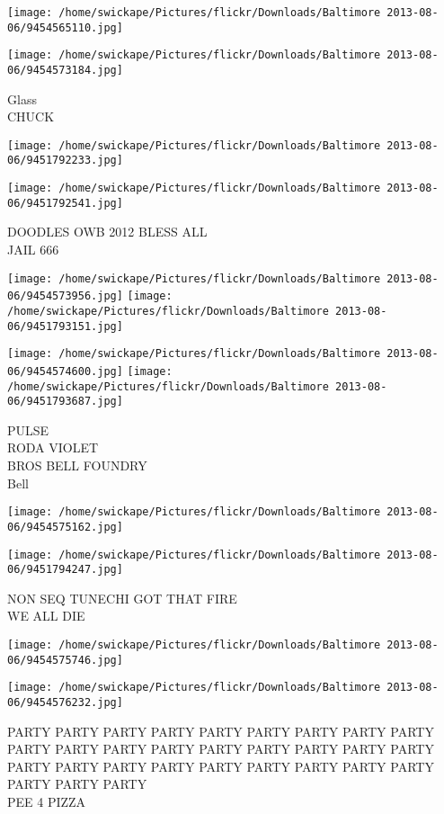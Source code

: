 \documentclass[10pt,letterpaper]{article}
\begin{document}
\texttt{[image: /home/swickape/Pictures/flickr/Downloads/Baltimore 2013-08-06/9454565110.jpg]}

\vspace{0.25in}
\texttt{[image: /home/swickape/Pictures/flickr/Downloads/Baltimore 2013-08-06/9454573184.jpg]}

Glass\\
CHUCK
\pagebreak

\texttt{[image: /home/swickape/Pictures/flickr/Downloads/Baltimore 2013-08-06/9451792233.jpg]}

\vspace{0.25in}
\texttt{[image: /home/swickape/Pictures/flickr/Downloads/Baltimore 2013-08-06/9451792541.jpg]}

DOODLES OWB 2012 BLESS ALL\\
JAIL 666
\pagebreak

\texttt{[image: /home/swickape/Pictures/flickr/Downloads/Baltimore 2013-08-06/9454573956.jpg]}
\texttt{[image: /home/swickape/Pictures/flickr/Downloads/Baltimore 2013-08-06/9451793151.jpg]}

\texttt{[image: /home/swickape/Pictures/flickr/Downloads/Baltimore 2013-08-06/9454574600.jpg]}
\texttt{[image: /home/swickape/Pictures/flickr/Downloads/Baltimore 2013-08-06/9451793687.jpg]}

PULSE\\
RODA VIOLET\\
BROS BELL FOUNDRY\\
Bell
\pagebreak

\texttt{[image: /home/swickape/Pictures/flickr/Downloads/Baltimore 2013-08-06/9454575162.jpg]}

\vspace{0.25in}
\texttt{[image: /home/swickape/Pictures/flickr/Downloads/Baltimore 2013-08-06/9451794247.jpg]}

NON SEQ TUNECHI GOT THAT FIRE\\
WE ALL DIE
\pagebreak

\texttt{[image: /home/swickape/Pictures/flickr/Downloads/Baltimore 2013-08-06/9454575746.jpg]}

\vspace{0.25in}
\texttt{[image: /home/swickape/Pictures/flickr/Downloads/Baltimore 2013-08-06/9454576232.jpg]}

PARTY PARTY PARTY PARTY PARTY PARTY PARTY PARTY PARTY PARTY PARTY PARTY PARTY PARTY PARTY PARTY PARTY PARTY PARTY PARTY PARTY PARTY PARTY PARTY PARTY PARTY PARTY PARTY PARTY PARTY\\
PEE 4 PIZZA
\pagebreak
\end{document}
